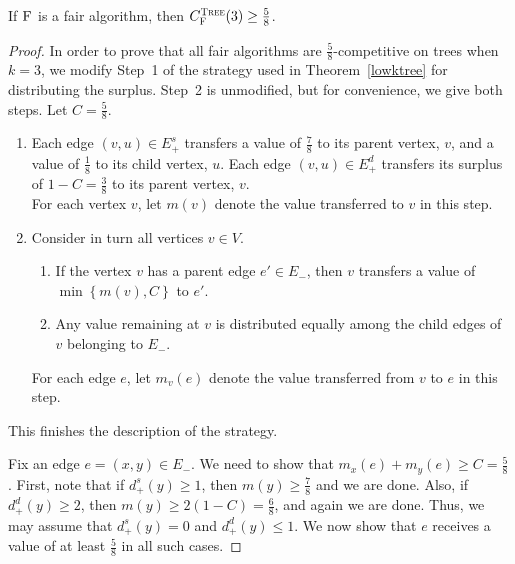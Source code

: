 \documentclass[smallextended]{svjour3}
\newcommand{\er}{\ensuremath{E_{-}}\xspace}
\newcommand{\FAIR}{\ensuremath{\operatorname{\textsc{F}}}\xspace}
\begin{document}
\begin{theorem}
\label{FAIRk3}
If $\FAIR$ is a fair algorithm, then $C_{\FAIR}^{\text{{\sc Tree}}}(3)\geq \frac{5}{8}$.
\end{theorem}
\begin{proof}
In order to prove that all fair algorithms are $\frac{5}{8}$-competitive on trees when $k=3$, we modify Step~1 of the strategy used in Theorem~\ref{lowktree} for distributing the surplus.  Step~2 is unmodified, but for convenience, we give both steps. Let $C=\frac{5}{8}$.
\begin{enumerate}[Step 1:]
\item Each edge $(v,u)\in E_+^s$ transfers a value of $\frac{7}{8}$ to its parent vertex, $v$, and a value of $\frac{1}{8}$ to its child vertex, $u$. Each edge $(v,u)\in E_+^d$ transfers its surplus of $1-C=\frac{3}{8}$ to its parent vertex, $v$.\\
 For each vertex $v$, let $m(v)$ denote the value transferred to $v$
  in this step. 
\item Consider in turn all vertices $v\in V$. 
  \begin{enumerate}
  \item If the vertex $v$ has a parent edge $e'\in\er$, then $v$ transfers a
    value of $\min\left\{m(v), C\right\}$ to $e'$.
  \item Any value remaining at $v$ is distributed equally among the
    child edges of $v$ belonging to $\er$.
  \end{enumerate}
  For each edge $e$, let $m_v(e)$ denote the value transferred from $v$ to $e$ in this step.
\end{enumerate}
This finishes the description of the strategy. 

Fix an edge $e=(x,y)\in E_{-}$. We need to show that $m_x(e)+m_y(e)\geq C=\frac{5}{8}$. First, note that if $d_+^s(y)\geq 1$, then $m(y)\geq \frac{7}{8}$ and we are done. Also, if $d_+^d(y)\geq 2$, then $m(y)\geq 2(1-C)=\frac{6}{8}$, and again we are done. Thus, we may assume that $d_+^s(y)=0$ and $d_+^d(y)\leq 1$. We now show that $e$ receives a value of at least $\frac{5}{8}$ in all such cases.


\end{proof}
\end{document}
